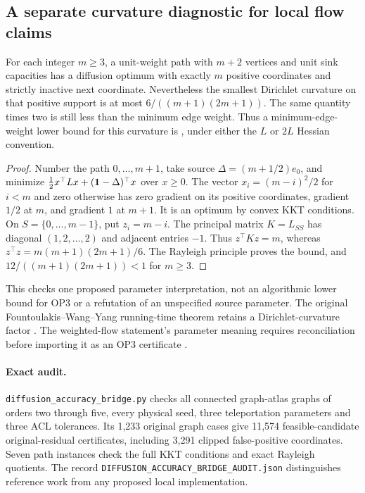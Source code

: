 \subsection{A separate curvature diagnostic for local flow claims}
\label{sec:op3-diffusion-path-curvature}

\begin{proposition}
\label{prop:op3-flow-path-curvature}
For each integer $m\geq3$, a unit-weight path with $m+2$ vertices and
unit sink capacities has a diffusion optimum with exactly $m$ positive
coordinates and strictly inactive next coordinate. Nevertheless the
smallest Dirichlet curvature on that positive support is at most
$6/((m+1)(2m+1))$. The same quantity times two is still less than the
minimum edge weight. Thus a minimum-edge-weight lower bound for this
curvature is \statusrefuted, under either the $L$ or $2L$ Hessian convention.
\end{proposition}
\begin{proof}
Number the path $0,\ldots,m+1$, take source
$\Delta=(m+1/2)e_0$, and minimize
$\tfrac12x^\top Lx+(\mathbf{1}-\Delta)^\top x$ over $x\geq0$.
The vector $x_i=(m-i)^2/2$ for $i<m$ and zero otherwise has zero
gradient on its positive coordinates, gradient $1/2$ at $m$, and gradient
$1$ at $m+1$. It is an optimum by convex KKT conditions.
On $S=\{0,\ldots,m-1\}$, put $z_i=m-i$.
The principal matrix $K=L_{SS}$ has diagonal $(1,2,\ldots,2)$ and
adjacent entries $-1$. Thus $z^\top Kz=m$, whereas
$z^\top z=m(m+1)(2m+1)/6$. The Rayleigh principle proves the bound,
and $12/((m+1)(2m+1))<1$ for $m\geq3$.
\end{proof}

This checks one proposed parameter interpretation, not an algorithmic
lower bound for OP3 or a refutation of an unspecified source parameter.
The original Fountoulakis--Wang--Yang running-time theorem retains a
Dirichlet-curvature factor \citep{fountoulakis2020pnorm}.
The weighted-flow statement's parameter meaning requires reconciliation
before importing it as an OP3 certificate \citep{yang2023weighted}.

\paragraph{Exact audit.}
\texttt{diffusion\_accuracy\_bridge.py} checks all connected graph-atlas
graphs of orders two through five, every physical seed, three teleportation
parameters and three ACL tolerances. Its 1,233 original graph cases give
11,574 feasible-candidate original-residual certificates, including 3,291
clipped false-positive coordinates. Seven path instances check the full
KKT conditions and exact Rayleigh quotients. The record
\texttt{DIFFUSION\_ACCURACY\_BRIDGE\_AUDIT.json} distinguishes reference
work from any proposed local implementation.
